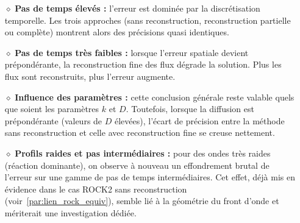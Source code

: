 \begin{itemize}
    \item[$\diamond$] \textbf{Pas de temps élevés :} l'erreur est dominée par la discrétisation temporelle. Les trois approches (sans reconstruction, reconstruction partielle ou complète) montrent alors des précisions quasi identiques.
    \item[$\diamond$] \textbf{Pas de temps très faibles :} lorsque l'erreur spatiale devient prépondérante, la reconstruction fine des flux dégrade la solution. Plus les flux sont reconstruits, plus l'erreur augmente.
    \item[$\diamond$] \textbf{Influence des paramètres :} cette conclusion générale reste valable quels que soient les paramètres $k$ et $D$. Toutefois, lorsque la diffusion est prépondérante (valeurs de $D$ élevées), l'écart de précision entre la méthode sans reconstruction et celle avec reconstruction fine se creuse nettement.
    \item[$\diamond$] \textbf{Profils raides et pas intermédiaires :} pour des ondes très raides (réaction dominante), on observe à nouveau un effondrement brutal de l'erreur sur une gamme de pas de temps intermédiaires. Cet effet, déjà mis en évidence dans le cas ROCK2 sans reconstruction (voir~\ref{par:lien_rock_equiv}), semble lié à la géométrie du front d'onde et mériterait une investigation dédiée.
\end{itemize}
\newpage
